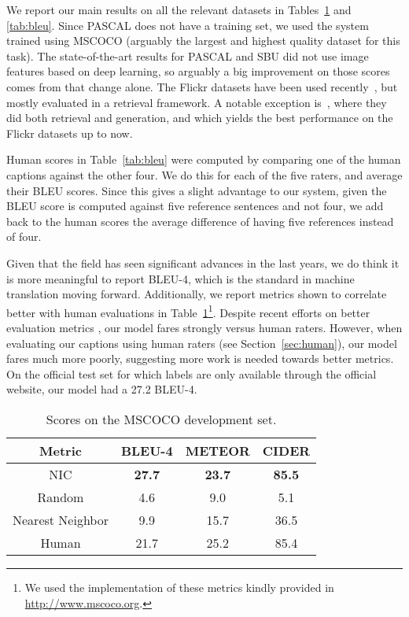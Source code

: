 We report our main results on all the relevant datasets in Tables~\ref{tab:coco} and \ref{tab:bleu}.
Since PASCAL does not have a training set, we used the system trained using MSCOCO (arguably
the largest and highest quality dataset for this task). The state-of-the-art results for PASCAL
and SBU did not use image features based on deep learning, so arguably a big improvement
on those scores comes from that change alone. The Flickr datasets have been used
recently~\cite{hodosh2013framing,baidu2014,kiros2014}, but mostly evaluated in a retrieval framework. A
notable exception is~\cite{baidu2014}, where they did both retrieval and generation, and which
yields the best performance on the Flickr datasets up to now.

Human scores in Table~\ref{tab:bleu} were computed by comparing one of the human captions against the other four.
We do this for each of the five raters, and average their BLEU scores. Since this gives a slight
advantage to our system, given the BLEU score is computed against five reference sentences
and not four, we add back to the human scores the average difference of having five references instead of four.

Given that the field has seen significant advances in the last years, we do think
it is more meaningful to report BLEU-4, which is the standard in machine translation moving forward. Additionally,
we report metrics shown to correlate better with human evaluations in Table~\ref{tab:coco}\footnote{We
used the implementation of these metrics kindly provided in \url{http://www.mscoco.org}.}.
Despite recent efforts on better evaluation metrics \cite{cider}, our model fares strongly versus
human raters. However, when evaluating our captions using human raters (see Section~\ref{sec:human}),
our model fares much more poorly, suggesting more work is needed towards better metrics.
On the official test set for which labels are only available through the official website, our model had a 27.2 BLEU-4.

\begin{table}
\centering
\begin{small}
\begin{tabular}{|c|c|c|c|}
 \hline
Metric & BLEU-4 & METEOR & CIDER \\
\hline
\hline
NIC   & \bf{27.7}  & \bf{23.7} & \bf{85.5}     \\
\hline
Random  &   4.6    &  9.0    &  5.1    \\
Nearest Neighbor & 9.9  & 15.7  & 36.5   \\
Human   & 21.7  & 25.2 & 85.4 \\
\hline
\end{tabular}
\end{small}
\caption{Scores on the MSCOCO development set.}\label{tab:coco}
\end{table}

